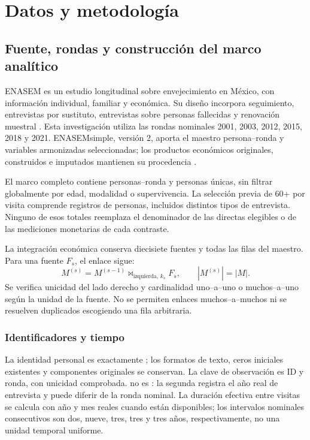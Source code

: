 \chapter{Datos y metodología}
\label{cap:datos}

\section{Fuente, rondas y construcción del marco analítico}
\label{sec:fuente-universo}

ENASEM es un estudio longitudinal sobre envejecimiento en México, con
información individual, familiar y económica. Su diseño incorpora seguimiento,
entrevistas por sustituto, entrevistas sobre personas fallecidas y renovación
muestral \citep{wong2017}. Esta investigación utiliza las rondas nominales
2001, 2003, 2012, 2015, 2018 y 2021. ENASEMsimple, versión 2, aporta el
maestro persona--ronda y variables armonizadas seleccionadas; los productos
económicos originales, construidos e imputados mantienen su procedencia
\citep{enasem2025simple,enasemconstruidos}.

El marco completo contiene \cpTotalRegistros{} personas--ronda y
\cpTotalPersonas{} personas únicas, sin filtrar globalmente por edad,
modalidad o supervivencia. La selección previa de 60+ por visita comprende
\cpMayoresRegistros{} registros de \cpMayoresPersonas{} personas, incluidos distintos tipos de entrevista.
Ninguno de esos totales reemplaza el denominador de las directas elegibles
o de las mediciones monetarias de cada contraste.

La integración económica conserva diecisiete fuentes y todas las filas del
maestro. Para una fuente $F_s$, el enlace sigue:
\begin{equation}
 M^{(s)}=M^{(s-1)}\Join_{\mathrm{izquierda},\,k_s}F_s,
 \qquad |M^{(s)}|=|M|.
 \label{eq:integracion-izquierda}
\end{equation}
Se verifica unicidad del lado derecho y cardinalidad uno--a--uno o
muchos--a--uno según la unidad de la fuente. No se permiten enlaces
muchos--a--muchos ni se resuelven duplicados escogiendo una fila arbitraria.

\subsection{Identificadores y tiempo}

La identidad personal es exactamente ; los formatos de
texto, ceros iniciales existentes y componentes originales se conservan.
La clave de observación es ID y ronda, con unicidad comprobada.
 no es : la segunda registra el año real
de entrevista y puede diferir de la ronda nominal. La duración efectiva entre
visitas se calcula con año y mes reales cuando están disponibles; los
intervalos nominales consecutivos son dos, nueve, tres, tres y tres años,
respectivamente, no una unidad temporal uniforme.

